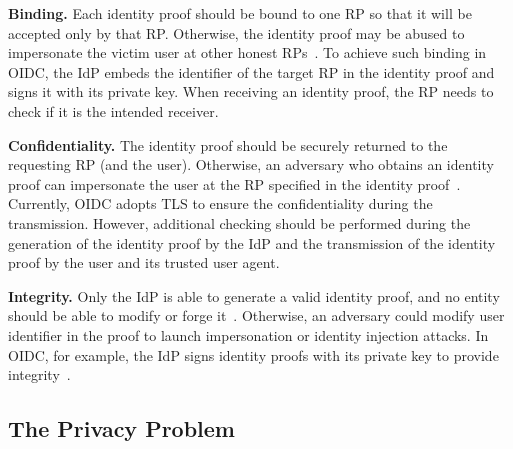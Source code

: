 \vspace{1mm}\noindent\textbf{Binding.} Each identity proof should be bound to one RP so that it will be accepted only by that RP. Otherwise, the identity proof may be abused to impersonate the victim user at other honest RPs~\cite{ChenPCTKT14, WangZLG16}. To achieve such binding in OIDC, the IdP embeds the identifier of the target RP in the identity proof and signs it with its private key. When receiving an identity proof, the RP needs to check if it is the intended receiver.

\vspace{1mm}\noindent\textbf{Confidentiality.} The identity proof should be securely returned to the requesting RP (and the user). Otherwise, an adversary who obtains an identity proof can impersonate the user at the RP specified in the identity proof~\cite{ChenPCTKT14,FettKS16,WangZLG16}. Currently, OIDC adopts TLS to ensure the confidentiality during the transmission. However, additional checking should be performed during the generation of the identity proof by the IdP and the transmission of the identity proof by the user and its trusted user agent.

\vspace{1mm}\noindent\textbf{Integrity.} Only the IdP is able to generate a valid identity proof,
    and no entity should be able to modify or forge it~\cite{WangZLG16}. Otherwise, an adversary could modify user identifier in the proof to launch impersonation or identity injection attacks. In OIDC, for example, the IdP signs identity proofs with its private key to provide integrity~\cite{WangCW12, SomorovskyMSKJ12}.

\subsection{The Privacy Problem}
\label{subsec:challenges}
\begin{comment}
In UPRESSO, the adversaries' goals to break the secure authentication are as follows:
\begin{itemize}
\item Impersonation attack: Adversary logs in to the honest RP as an honest user. The adversary might achieve the goal by obtaining a user's identity proof in the ways, such as stealing the proof (from the unprotected HTTP transmission), forging the valid proof (if the integrity is not guaranteed), leading the user to upload a proof valid for other RPs (the proof is not bound with specific RP).
\item Identity Injection: Honest user logs in to the honest RP under adversaries' identity. The adversary might achieve this goal by replacing the identity transmitted from IdP to RP or lead the user uploads the malicious identity proof in various ways (e.g., CSRF).
\end{itemize}
\end{comment}


